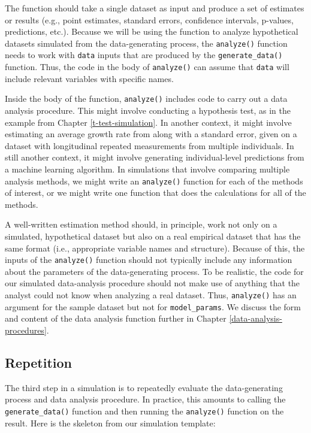 \documentclass[
]{book}
\begin{document}
The function should take a single dataset as input and produce a set of estimates or results (e.g., point estimates, standard errors, confidence intervals, p-values, predictions, etc.).
Because we will be using the function to analyze hypothetical datasets simulated from the data-generating process, the \texttt{analyze()} function needs to work with \texttt{data} inputs that are produced by the \texttt{generate\_data()} function.
Thus, the code in the body of \texttt{analyze()} can assume that \texttt{data} will include relevant variables with specific names.

Inside the body of the function, \texttt{analyze()} includes code to carry out a data analysis procedure.
This might involve conducting a hypothesis test, as in the example from Chapter \ref{t-test-simulation}.
In another context, it might involve estimating an average growth rate from along with a standard error, given on a dataset with longitudinal repeated measurements from multiple individuals.
In still another context, it might involve generating individual-level predictions from a machine learning algorithm.
In simulations that involve comparing multiple analysis methods, we might write an \texttt{analyze()} function for each of the methods of interest, or we might write one function that does the calculations for all of the methods.

A well-written estimation method should, in principle, work not only on a simulated, hypothetical dataset but also on a real empirical dataset that has the same format (i.e., appropriate variable names and structure).
Because of this, the inputs of the \texttt{analyze()} function should not typically include any information about the parameters of the data-generating process.
To be realistic, the code for our simulated data-analysis procedure should not make use of anything that the analyst could not know when analyzing a real dataset.
Thus, \texttt{analyze()} has an argument for the sample dataset but not for \texttt{model\_params}.
We discuss the form and content of the data analysis function further in Chapter \ref{data-analysis-procedures}.

\subsection{Repetition}\label{repetition}

The third step in a simulation is to repeatedly evaluate the data-generating process and data analysis procedure.
In practice, this amounts to calling the \texttt{generate\_data()} function and then running the \texttt{analyze()} function on the result.
Here is the skeleton from our simulation template:
\end{document}
